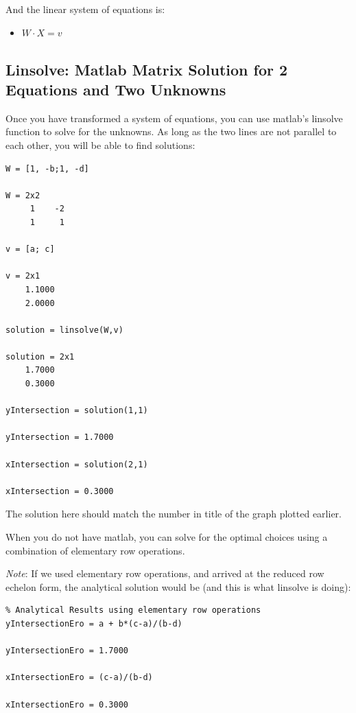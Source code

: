 \documentclass[
]{book}
\providecommand{\tightlist}{%
  \setlength{\itemsep}{0pt}\setlength{\parskip}{0pt}}
\begin{document}
And the linear system of equations is:

\begin{itemize}
\tightlist
\item
  \(\displaystyle W\cdot {X}=v\)
\end{itemize}

\hypertarget{linsolve-matlab-matrix-solution-for-2-equations-and-two-unknowns}{%
\subsection{Linsolve: Matlab Matrix Solution for 2 Equations and Two Unknowns}\label{linsolve-matlab-matrix-solution-for-2-equations-and-two-unknowns}}

Once you have transformed a system of equations, you can use matlab's
linsolve function to solve for the unknowns. As long as the two lines
are not parallel to each other, you will be able to find solutions:

\begin{verbatim}
W = [1, -b;1, -d]

W = 2x2    
     1    -2
     1     1

v = [a; c]

v = 2x1    
    1.1000
    2.0000

solution = linsolve(W,v)

solution = 2x1    
    1.7000
    0.3000

yIntersection = solution(1,1)

yIntersection = 1.7000

xIntersection = solution(2,1)

xIntersection = 0.3000
\end{verbatim}

The solution here should match the number in title of the graph plotted
earlier.

When you do not have matlab, you can solve for the optimal choices using
a combination of elementary row operations.

\emph{Note}: If we used elementary row operations, and arrived at the reduced
row echelon form, the analytical solution would be (and this is what
linsolve is doing):

\begin{verbatim}
% Analytical Results using elementary row operations
yIntersectionEro = a + b*(c-a)/(b-d)

yIntersectionEro = 1.7000

xIntersectionEro = (c-a)/(b-d)

xIntersectionEro = 0.3000
\end{verbatim}
\end{document}
